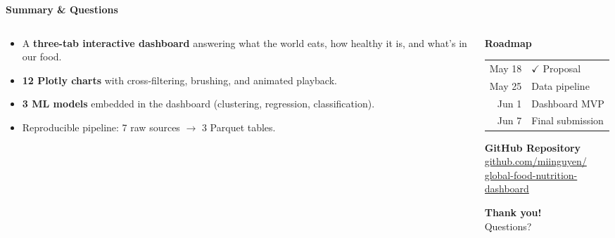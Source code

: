 \documentclass[aspectratio=169, 10pt]{beamer}
\begin{document}
\begin{frame}
\begin{center}
  {\large\bfseries\textcolor{NDarkGreen}{Summary \& Questions}}
\end{center}
\vspace{-2pt}
\begin{columns}[T]
  \begin{column}{0.55\textwidth}
    \begin{tcolorbox}[gbox, title={\footnotesize\bfseries What We Will Deliver},
      coltitle=white, colbacktitle=NGreen]
      \footnotesize
      \begin{itemize}\setlength\itemsep{1pt}
        \item A \textbf{three-tab interactive dashboard} answering what
              the world eats, how healthy it is, and what's in our food.
        \item \textbf{12 Plotly charts} with cross-filtering, brushing,
              and animated playback.
        \item \textbf{3 ML models} embedded in the dashboard
              (clustering, regression, classification).
        \item Reproducible pipeline: 7 raw sources $\to$ 3 Parquet tables.
      \end{itemize}
    \end{tcolorbox}
  \end{column}
  \begin{column}{0.42\textwidth}
    \begin{tcolorbox}[dbox, halign=center]
      \footnotesize
      \textbf{Roadmap}\\[3pt]
      \begin{tabular}{@{}rl@{}}
        May 18 & $\checkmark$ Proposal\\
        May 25 & Data pipeline\\
        Jun 1  & Dashboard MVP\\
        Jun 7  & Final submission\\
      \end{tabular}
    \end{tcolorbox}
    \vspace{3pt}
    \begin{tcolorbox}[ybox, halign=center]
      \footnotesize
      \textbf{GitHub Repository}\\[2pt]
      \href{https://github.com/miinguyen/global-food-nutrition-dashboard}%
           {\textcolor{NOrange}{\small github.com/miinguyen/\\global-food-nutrition-dashboard}}
    \end{tcolorbox}
    \vspace{6pt}
    \begin{center}
      {\Large\bfseries\textcolor{NDarkGreen}{Thank you!}}\\[2pt]
      {\footnotesize\textcolor{NBrown}{Questions?}}
    \end{center}
  \end{column}
\end{columns}
\end{frame}
\end{document}
